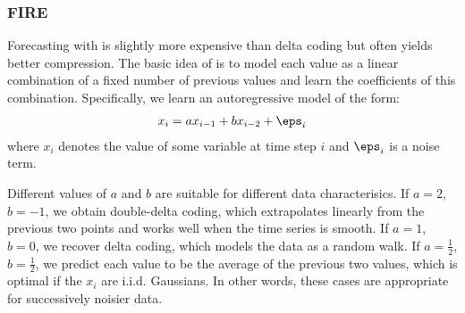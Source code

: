 \subsubsection{FIRE}

Forecasting with \fire is slightly more expensive than delta coding but often yields better compression.
The basic idea of \fire is to model each value as a linear combination of a fixed number of previous values and learn the coefficients of this combination. Specifically, we learn an autoregressive model of the form:
\begin{align}
    x_i = a x_{i-1} + b x_{i-2} + \eps_i
\end{align}
where $x_i$ denotes the value of some variable at time step $i$ and $\eps_i$ is a noise term.

Different values of $a$ and $b$ are suitable for different data characterisics. If $a = 2$, $b = -1$, we obtain double-delta coding, which extrapolates linearly from the previous two points and works well when the time series is smooth. If $a = 1$, $b = 0$, we recover delta coding, which models the data as a random walk. If $a = \frac{1}{2}$, $b = \frac{1}{2}$, we predict each value to be the average of the previous two values, which is optimal if the $x_i$ are i.i.d. Gaussians. In other words, these cases are appropriate for successively noisier data.


